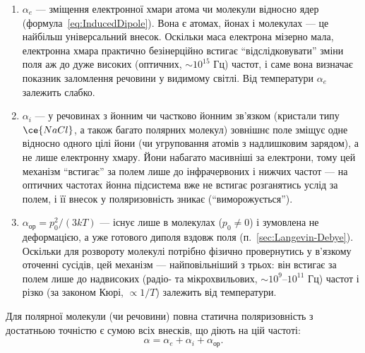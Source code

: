 \begin{enumerate}
	\item {} $\alpha_e$ --- зміщення електронної хмари атома чи молекули відносно ядер
	      (формула~\eqref{eq:InducedDipole}). Вона є  атомах, йонах і молекулах --- це найбільш універсальний внесок.
	      Оскільки маса електрона мізерно мала, електронна хмара практично безінерційно встигає \enquote{відслідковувати} зміни поля аж до дуже
	      високих (оптичних, $\sim 10^{15}$ Гц) частот, і саме вона визначає показник заломлення речовини у видимому світлі. Від температури
	      $\alpha_e$ залежить слабко.
	\item {} $\alpha_i$ --- у речовинах з йонним чи частково йонним зв'язком (кристали типу $\ce{NaCl}$, а також
	      багато полярних молекул) зовнішнє поле зміщує одне відносно одного цілі йони (чи угруповання атомів з надлишковим зарядом), а не лише
	      електронну хмару. Йони набагато масивніші за електрони, тому цей механізм \enquote{встигає} за полем лише до інфрачервоних і нижчих частот
	      --- на оптичних частотах йонна підсистема вже не встигає розганятись услід за полем, і її внесок у поляризовність зникає (\enquote{виморожується}).
	\item {} $\alpha_\text{ор} = p_0^2/(3kT)$ --- існує лише в  молекулах ($p_0\neq0$) і
	      зумовлена не деформацією, а  уже готового диполя вздовж поля (п.~\ref{sec:Langevin-Debye}). Оскільки для розвороту
	      молекулі потрібно фізично провернутись у в'язкому оточенні сусідів, цей механізм --- найповільніший з трьох: він встигає за полем лише до
	      надвисоких (радіо- та мікрохвильових, $\sim10^9$--$10^{11}$ Гц) частот і різко (за законом Кюрі, $\propto 1/T$) залежить від температури.
\end{enumerate}

Для полярної молекули (чи речовини) повна статична поляризовність з достатньою точністю є сумою всіх внесків, що діють на цій частоті:
\begin{equation*}
	\alpha = \alpha_e + \alpha_i + \alpha_\text{ор}.
\end{equation*}

